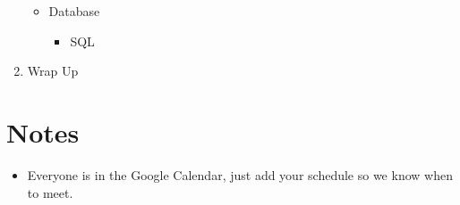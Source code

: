 \documentclass{article}
\begin{document}
\begin{enumerate}
\begin{itemize}
    \item Database
        \begin{itemize}
        \item SQL
        \end{itemize}
    \end{itemize}
\item Wrap Up
\end{enumerate}

\section{Notes}
\begin{itemize}
\item Everyone is in the Google Calendar, just add your schedule so we know when to meet.
\end{itemize}
\end{document}
